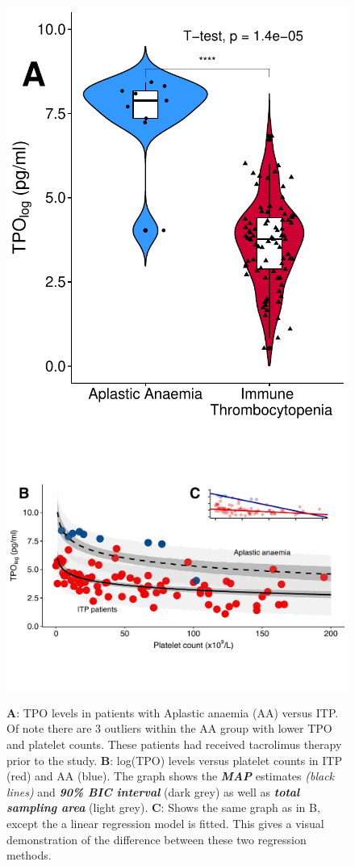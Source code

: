 \documentclass[landscape,a0paper,fontscale=0.285]{beamer} %
\newlength{\onecolwid}
\newlength{\twocolwid}
\begin{document}
\begin{frame}[t]
\begin{columns}[t]
\begin{column}{\twocolwid}
\begin{columns}[t,totalwidth=\twocolwid]
\begin{column}{\onecolwid}




\end{column} %

\end{columns} %


\begin{figure}%
    \centering
    {{\includegraphics[width=0.29\linewidth]{fig/AA_vs_ITP_2.pdf}}}%
    \qquad
    {{\includegraphics[width=0.67\linewidth]{fig/bayes_model2.pdf}}}%
    \caption{\textbf{A}: TPO levels in patients with Aplastic anaemia (AA) versus ITP. Of note there are 3 outliers within the AA group with lower TPO and platelet counts. These patients had received tacrolimus therapy prior to the study. \textbf{B}: log(TPO) levels versus platelet counts in ITP (red) and AA (blue). The graph shows the \textit{\textbf{MAP}} estimates \emph{(black lines)} and \textit{\textbf{90\% BIC interval}} (dark grey) as well as \textit{\textbf{total sampling area}} (light grey). \textbf{C}: Shows the same graph as in B, except the a linear regression model is fitted. This gives a visual demonstration of the difference between these two regression methods.}%
    \label{fig:example}%
\end{figure}



\end{column}
\end{columns}
\end{frame}
\end{document}

